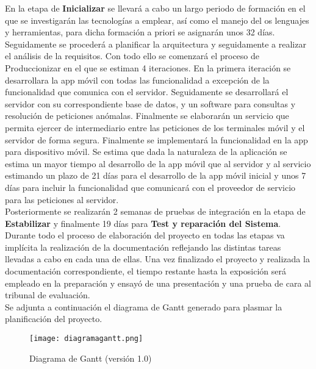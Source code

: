 En la etapa de \textbf{Inicializar} se llevará a cabo un largo periodo de formación en el que se investigarán las tecnologías a emplear, así como el manejo del os lenguajes y herramientas, para dicha formación a priori se asignarán unos 32 días. Seguidamente se procederá a planificar la arquitectura y seguidamente a realizar el análisis de la requisitos. Con todo ello se comenzará el proceso de Produccionizar en el que se estiman 4 iteraciones. En la primera iteración se desarrollara la app móvil con todas las funcionalidad a excepción de la funcionalidad que comunica con el servidor. Seguidamente se desarrollará el servidor con su correspondiente base de datos, y un software para consultas y resolución de peticiones anómalas. Finalmente se elaborarán un servicio que permita ejercer de intermediario entre las peticiones de los terminales móvil y el servidor de forma segura. Finalmente se implementará la funcionalidad en la app para dispositivo móvil. Se estima que dada la naturaleza de la aplicación se estima un mayor tiempo al desarrollo de la app móvil que al servidor y al servicio estimando un plazo de 21 días para el desarrollo de la app móvil inicial y unos 7 días para incluir la funcionalidad que comunicará con el proveedor de servicio para las peticiones al servidor.  \\

Posteriormente se realizarán 2 semanas de pruebas de integración en la etapa de \textbf{Estabilizar} y finalmente 19 días para \textbf{Test y reparación del Sistema}. Durante todo el proceso de elaboración del proyecto en todas las etapas va implícita la realización de la documentación reflejando las distintas tareas llevadas a cabo en cada una de ellas. Una vez finalizado el proyecto y realizada la documentación correspondiente, el tiempo restante hasta la exposición será empleado en la preparación y ensayó de una presentación y una prueba de cara al tribunal de evaluación. \\

Se adjunta a continuación el diagrama de Gantt generado para plasmar la planificación del proyecto. 

\begin{figure}[H]
  \centering
  \texttt{[image: diagramagantt.png]}
  \caption{Diagrama de Gantt (versión 1.0)}
\end{figure}
